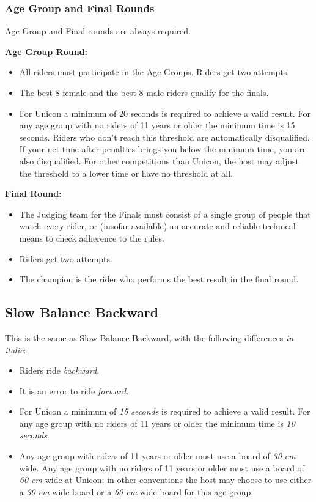 \subsubsection{Age Group and Final Rounds}
Age Group and Final rounds are always required.

\textbf{Age Group Round:}
\begin{itemize}
\item All riders must participate in the Age Groups.
Riders get two attempts.
\item The best 8 female and the best 8 male riders qualify for the finals.
\item For Unicon a minimum of 20 seconds is required to achieve a valid result.
For any age group with no riders of 11 years or older the minimum time is 15 seconds.
Riders who don't reach this threshold are automatically disqualified.
If your net time after penalties brings you below the minimum time, you are also disqualified.
For other competitions than Unicon, the host may adjust the threshold to a lower time or have no threshold at all.
\end{itemize}

\textbf{Final Round:}
\begin{itemize}
\item The Judging team for the Finals must consist of a single group of people that watch every rider, or (insofar available) an accurate and reliable technical means to check adherence to the rules.
\item Riders get two attempts.
\item The champion is the rider who performs the best result in the final round.
\end{itemize}

\subsection{Slow Balance Backward}
This is the same as Slow Balance Backward, with the following differences \textit {in italic}:
\begin{itemize}
\item Riders ride \textit{backward}.
\item It is an error to ride \textit{forward}.
\item For Unicon a minimum of \textit{15 seconds} is required to achieve a valid result.
For any age group with no riders of 11 years or older the minimum time is \textit{10 seconds}.
\item Any age group with riders of 11 years or older must use a board of \textit{30 cm} wide.
Any age group with no riders of 11 years or older must use a board of \textit{60 cm} wide at Unicon; in other conventions the host may choose to use either a \textit{30 cm} wide board or a \textit{60 cm} wide board for this age group.
\end{itemize}

